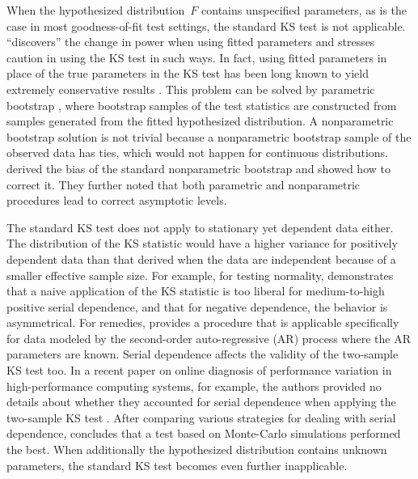 \documentclass[12pt, letterpaper]{article}
\begin{document}
When the hypothesized distribution~$F$ contains unspecified parameters, as is
the case in most goodness-of-fit test settings, the standard KS test is not
applicable. \citet{steinskog2007cautionary} ``discovers'' the change in power
when using fitted parameters and stresses caution in using the KS test in
such ways. In fact, using fitted parameters in place of the true parameters in
the KS test has been long known to yield extremely conservative results
\citep[e.g.,][]{lilliefors1967kolmogorov}. This problem can be solved by
parametric bootstrap \citep{efron1985bootstrap, hall1991two}, where
bootstrap samples of the test statistics are constructed from samples
generated from the fitted hypothesized distribution. A nonparametric bootstrap
solution is not trivial because a nonparametric bootstrap sample of the
observed data has ties, which would not happen for continuous distributions.
\citet{babu2004goodness} derived the bias of the standard nonparametric 
bootstrap and
showed how to correct it. They further noted that both parametric and
nonparametric procedures lead to correct asymptotic levels.


The standard KS test does not apply to stationary yet dependent data either. The
distribution of the KS statistic would have a higher variance for positively
dependent data than that derived when the data are independent because of a
smaller effective sample size. For example, for testing normality,
\citet{durilleul1992lack} demonstrates that a naive application of
the KS statistic is too liberal for medium-to-high positive serial dependence,
and that for negative dependence, the behavior is asymmetrical. For remedies,
\citet{weiss1978modification} provides a procedure that is applicable 
specifically for data
modeled by the second-order auto-regressive (AR) process where the AR parameters
are known. Serial dependence affects the validity of the two-sample KS test too.
In a recent paper on online diagnosis of performance variation in
high-performance computing systems, for example, the authors provided no details
about whether they accounted for serial dependence when applying the two-sample
KS test \citep{tuncer2019online}. After comparing various strategies for dealing
with serial dependence, \citet{lanzante2021testing} concludes that a test based
on Monte-Carlo simulations performed the best.
When additionally the hypothesized distribution contains unknown
parameters, the standard KS test becomes even further inapplicable. 
\end{document}
